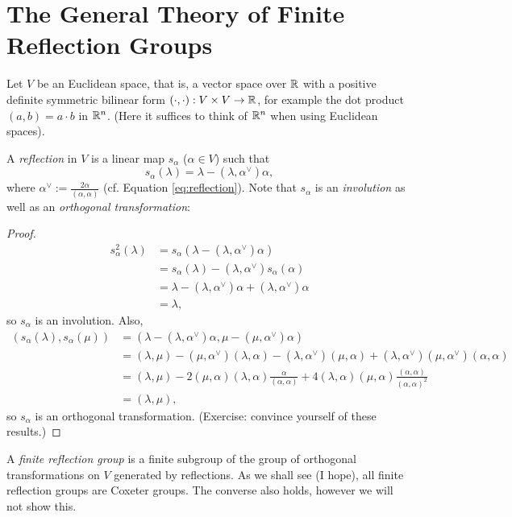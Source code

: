 \section{The General Theory of Finite Reflection Groups}

Let $V$ be an Euclidean space, that is,
a vector space over $\mathbb{R}$ with a positive definite
symmetric bilinear form $(\cdot, \cdot) : V \times V \to \mathbb{R}$,
for example the dot product $(a, b) = a \cdot b$ in $\mathbb{R}^n$.
(Here it suffices to think of $\mathbb{R}^n$ when using Euclidean spaces).

A {\em reflection} in $V$ is a linear map $s_\alpha$ ($\alpha \in V$)
such that
\[
    s_\alpha(\lambda) = \lambda - (\lambda, \alpha^\vee) \alpha,
\]
where $\alpha^\vee := \frac{2\alpha}{(\alpha,\alpha)}$ (cf. Equation
\eqref{eq:reflection}).
Note that $s_\alpha$ is an {\em involution} as well as an {\em orthogonal
transformation}:
\begin{proof}
\begin{align*}
s_\alpha^2(\lambda) &= s_\alpha(\lambda - (\lambda, \alpha^\vee) \alpha) \\
&= s_\alpha(\lambda) - (\lambda, \alpha^\vee) s_\alpha(\alpha) \\
&= \lambda - (\lambda, \alpha^\vee) \alpha + (\lambda, \alpha^\vee) \alpha \\
&= \lambda,
\end{align*}
so $s_\alpha$ is an involution. Also,
\begin{align*}
(s_\alpha(\lambda), s_\alpha(\mu))
&= (\lambda - (\lambda, \alpha^\vee) \alpha, \mu - (\mu, \alpha^\vee) \alpha) \\
&= (\lambda, \mu) - (\mu, \alpha^\vee) (\lambda, \alpha)
   - (\lambda, \alpha^\vee) (\mu, \alpha)
   + (\lambda, \alpha^\vee) (\mu, \alpha^\vee) (\alpha, \alpha) \\
&= (\lambda, \mu)
   - 2 (\mu, \alpha) (\lambda, \alpha) \frac{\alpha}{(\alpha, \alpha)}
   + 4 (\lambda, \alpha) (\mu, \alpha) \frac{(\alpha, \alpha)}{(\alpha, \alpha)^2} \\
&= (\lambda, \mu),
\end{align*}
so $s_\alpha$ is an orthogonal transformation. (Exercise: convince yourself of
these results.)
\end{proof}

A {\em finite reflection group} is a finite subgroup of the group of orthogonal
transformations on $V$ generated by reflections. As we shall see (I hope),
all finite reflection groups are Coxeter groups.
The converse also holds, however we will not show this.

